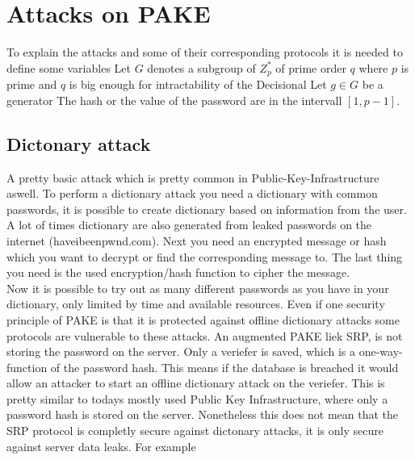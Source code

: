 \documentclass[journal]{IEEEtran}
\begin{document}
\section{Attacks on PAKE}
To explain the attacks and some of their corresponding protocols it is needed to define some variables
Let $G$ denotes a subgroup of $Z^{*}_{p}$ of prime order $q$ where $p$ is prime and $q$ is big enough for intractability of the Decisional %
Let $g \in G$ be a generator
The hash or the value of the password are in the intervall $[1,p-1]$.

\subsection{Dictonary attack}
A pretty basic attack which is pretty common in Public-Key-Infrastructure aswell.
To perform a dictionary attack you need a dictionary with common passwords, it is possible to create dictionary based on information from the user. 
A lot of times dictionary are also generated from leaked passwords on the internet (haveibeenpwnd.com).
Next you need an encrypted message or hash which you want to decrypt or find the corresponding message to.
The last thing you need is the used encryption/hash function to cipher the message. \\
Now it is possible to try out as many different passwords as you have in your dictionary, only limited by time and available resources.
Even if one security principle of PAKE is that it is protected against offline dictionary attacks some protocols are vulnerable to these attacks.
An augmented PAKE liek SRP, is not storing the password on the server. Only a veriefer is saved, which is a one-way-function of the password hash.
This means if the database is breached it would allow an attacker to start an offline dictionary attack on the veriefer. 
This is pretty similar to todays mostly used Public Key Infrastructure, where only a password hash is stored on the server.
Nonetheless this does not mean that the SRP protocol is completly secure against dictonary attacks, it is only secure against server data leaks.
For example %
\end{document}
